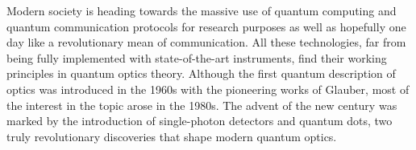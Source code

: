 \begin{comment}
An important theoretical overview is provided in \emph{\autoref{Capitolo2}}, where some key topics like timing jitter and optical pulses are accompanied by the working principles of the main experimental procedures implemented among the project.
In particular, the reader will be presented beforehand a comprehensive treatment of timing jitter from its essentials to some more inner insights.
Subsequently, an introduction to optical pulses is provided, spending some focus also towards the Time Bandwidth Product (TBP) one of the key properties.
The Chapter ends with a comprehensive description of the working principles of the main experimental techniques implemented widely within the project, namely the Hanbury, Brown, Twiss experiment and the Time-Correlated Single Photon Counting.

This initial theoretical framework represents provides the foundation for the two following chapters, presenting the two experimental sections of this project.

\autoref{Capitolo3} presents to the reader the study of electro-optically generated picosecond pulses, with the use of a modern day superconducting-nanowire single photon detector (SNSPD).
The reader will then be presented the experimental setup and its features, to move on subsequently with a precise description of the operations conducted on the raw data. Results will be then presented and discussed in the final part of the chapter.


\autoref{Capitolo4} presents the second part of the project, focused on optimizing TCSPC and HBT measurements of a femtosecond pulsed laser source.
Although the final outcomes are naturally different, the structure of this chapter keeps the scheme of the previous one, starting with the description of the experimental setup and citing the key differences with the previous one.
The reader will follow the initial issues encountered, the subsequent analysis, and the troubleshooting steps.
A final discussion is provided to assess whether the results obtained are encouraging or if no relevant progress has been made.

Finally, a summary of the project and a concise overview of further developments is presented in \autoref{capitolo5}.

\end{comment}

Modern society is heading towards the massive use of quantum computing and quantum communication protocols for research purposes as well as hopefully one day like a revolutionary mean of communication.
All these technologies, far from being fully implemented with state-of-the-art instruments, find their working principles in quantum optics theory.
Although the first quantum description of optics was introduced in the 1960s with the pioneering works of Glauber, most of the interest in the topic arose in the 1980s.
The advent of the new century was marked by the introduction of single-photon detectors and quantum dots, two truly revolutionary discoveries that shape modern quantum optics.

